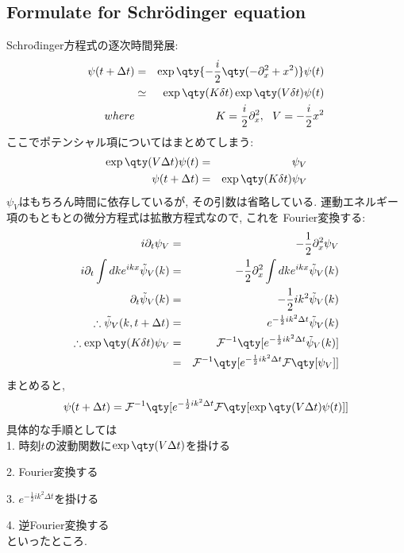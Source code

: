 \documentclass[10.5pt,a4paper]{jreport}
\begin{document}
\subsection{Formulate for Schr\"odinger equation}
Schro\"dinger方程式の逐次時間発展:
\begin{eqnarray}
  \psi(t + \Delta t) &=& \exp\qty{-\frac{i}{2}\qty(-\partial_x^2 + x^2)}\psi(t)\\
  &\simeq& \exp\qty(K\delta t)\exp\qty(V\delta t)\psi(t)\\
  \nonumber   where&&\ \ K = \frac{i}{2}\partial_x^2,\ \ V = - \frac{i}{2}x^2
\end{eqnarray}
ここでポテンシャル項についてはまとめてしまう:
\begin{eqnarray}
  \exp\qty(V\Delta t)\psi(t) &=& \psi_V\\
  \psi(t + \Delta t) &=& \exp\qty(K\delta t)\psi_V
\end{eqnarray}
$\psi_V$はもちろん時間に依存しているが, その引数は省略している. 運動エネルギー項のもともとの微分方程式は拡散方程式なので, これを Fourier変換する:
\begin{eqnarray}
  i\partial_t \psi_V &=& -\frac{1}{2}\partial_x^2 \psi_V\\
  i\partial_t\int dk e^{ikx}\tilde{\psi}_V(k) &=& -\frac{1}{2}\partial_x^2 \int dk e^{ikx}\tilde{\psi}_V(k)\\
  \partial_t \tilde{\psi}_V(k) &=& -\frac{1}{2} ik^2\tilde{\psi}_V(k)\\
  \therefore \tilde{\psi}_V(k, t+\Delta t) &=& e^{-\frac{1}{2} ik^2\Delta t}\tilde{\psi}_V(k)\\
  \nonumber  \therefore \exp\qty(K\delta t)\psi_V &=& {\cal F}^{-1}\qty[e^{-\frac{1}{2} ik^2\Delta t}\tilde{\psi}_V(k)]\\
  &=& {\cal F}^{-1}\qty[e^{-\frac{1}{2} ik^2\Delta t}{\cal F}\qty[\psi_V]]
\end{eqnarray}
まとめると,
\begin{eqnarray}
  \psi(t+\Delta t) = {\cal F}^{-1}\qty[e^{-\frac{1}{2} ik^2\Delta t}{\cal F}\qty[\exp\qty(V\Delta t)\psi(t)]]
\end{eqnarray}
具体的な手順としては\\

1. 時刻$t$の波動関数に$\exp\qty(V\Delta t)$を掛ける

2. Fourier変換する

3. $e^{-\frac{1}{2} ik^2\Delta t}$を掛ける

4. 逆Fourier変換する\\

といったところ.
\end{document}
